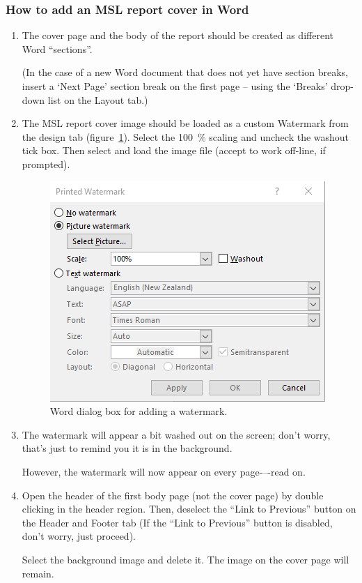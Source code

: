 \subsubsection{How to add an MSL report cover in Word}
\begin{enumerate}
\item	The cover page and the body of the report should be created as different Word ``sections''. 

(In the case of a new Word document that does not yet have section breaks, insert a `Next Page' section break on the first page -- using the `Breaks' drop-down list on the Layout tab.)
\item 	The MSL report cover image should be loaded as a custom Watermark from the design tab (figure~\ref{fig:word_watermark_dialog}). Select the \SI{100}{\%} scaling and uncheck the washout tick box. Then select and load the image file (accept to work off-line, if prompted).

\begin{figure}[h]
\centering
\includegraphics[scale=1]{pictures/word_watermark_dialog}
\caption{Word dialog box for adding a watermark.}
\label{fig:word_watermark_dialog}
\end{figure}
\item	The watermark will appear a bit washed out on the screen; don't worry, that's just to remind you it is in the background. 

However, the watermark will now appear on every page-–-read on. 
\item Open the header of the first body page (not the cover page) by double clicking in the header region. Then, deselect the ``Link to Previous'' button on the Header and Footer tab (If the ``Link to Previous'' button is disabled, don't worry, just proceed). 

Select the background image and delete it. The image on the cover page will remain. 

\end{enumerate}

